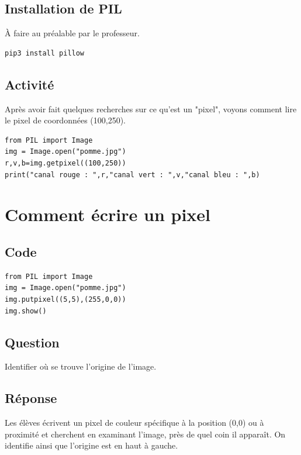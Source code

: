 \documentclass[11pt]{article}
\begin{document}
\subsection{Installation de PIL}
\label{sec:org7e0bb9c}

À faire au préalable par le professeur.

\begin{verbatim}
pip3 install pillow
\end{verbatim}

\subsection{Activité}
\label{sec:org7f1a2d2}

Après avoir fait quelques recherches sur ce qu'est un "pixel", voyons comment lire le pixel de coordonnées (100,250).

\begin{verbatim}
from PIL import Image
img = Image.open("pomme.jpg")
r,v,b=img.getpixel((100,250))
print("canal rouge : ",r,"canal vert : ",v,"canal bleu : ",b)
\end{verbatim}


\section{Comment écrire un pixel}
\label{sec:org7a6c59f}

\subsection{Code}
\label{sec:org86060fa}

\begin{verbatim}
from PIL import Image
img = Image.open("pomme.jpg")
img.putpixel((5,5),(255,0,0))
img.show()
\end{verbatim}

\subsection{Question}
\label{sec:org1ea215b}
Identifier où se trouve l'origine de l'image.

\subsection{Réponse}
\label{sec:orgb8eff15}
Les élèves  écrivent un pixel de couleur spécifique à la position (0,0) ou à proximité et cherchent en examinant l'image, près de quel coin  il apparaît. On identifie ainsi que l'origine est en haut à gauche.
\end{document}
